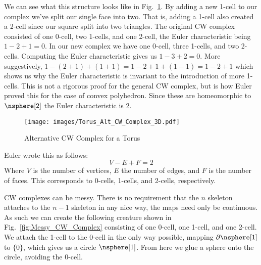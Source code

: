     \par\vspace{2.5ex}
    We can see what this structure looks like in
    Fig.~\ref{fig:Alt_CW_Complex_for_Torus_3D}. By adding a new 1-cell
    to our complex we've split our single face into two. That is, adding
    a 1-cell also created a 2-cell since our square split into two
    triangles. The original CW complex consisted of one 0-cell, two
    1-cells, and one 2-cell, the Euler characteristic being $1-2+1=0$.
    In our new complex we have one 0-cell, three 1-cells, and two
    2-cells. Computing the Euler characteristic gives us $1-3+2=0$. More
    suggestively, $1-(2+1)+(1+1)=1-2+1+(1-1)=1-2+1$ which shows us why
    the Euler characteristic is invariant to the introduction of more
    1-cells. This is not a rigorous proof for the general CW complex,
    but is how Euler proved this for the case of convex polyhedron.
    Since these are homeomorphic to $\nsphere[2]$ the Euler
    characteristic is 2.
    \begin{figure}
        \centering
        \captionsetup{type=figure}
        \if{}
            \texttt{[image: images/Torus\_Alt\_CW\_Complex\_3D.pdf]}
        \fi
        \caption{Alternative CW Complex for a Torus}
        \label{fig:Alt_CW_Complex_for_Torus_3D}
    \end{figure}
    Euler wrote this as follows:
    \begin{equation}
        V-E+F=2
    \end{equation}
    Where $V$ is the number of vertices, $E$ the number of edges, and
    $F$ is the number of faces. This corresponds to 0-cells, 1-cells,
    and 2-cells, respectively.
    \par\hfill\par
    \hfill
    \begin{minipage}[t]{0.56\textwidth}
        CW complexes can be messy. There is no requirement that the $n$
        skeleton attaches to the $n-1$ skeleton in any nice way, the
        maps need only be continuous. As such we can create the
        following creature shown in Fig.~\ref{fig:Messy_CW_Complex}
        consisting of one 0-cell, one 1-cell, and one 2-cell. We attach
        the 1-cell to the 0-cell in the only way possible, mapping
        $\partial\nsphere[1]$ to $\{0\}$, which gives us a circle
        $\nsphere[1]$. From here we glue a sphere onto the circle,
        avoiding the 0-cell.
    \end{minipage}
